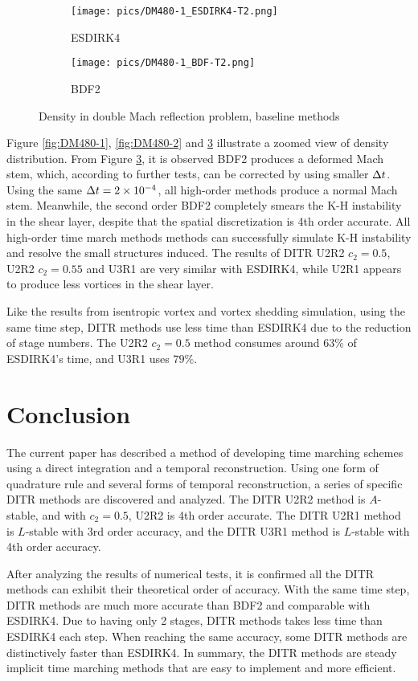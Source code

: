 \begin{figure}[htbp]
    \centering
    \begin{subfigure}{0.5\textwidth}
        \texttt{[image: pics/DM480-1\_ESDIRK4-T2.png]}
        \caption[]{ESDIRK4}
        \label{sfig:DM480_ESDIRK4}
    \end{subfigure}\hfill
    \begin{subfigure}{0.5\textwidth}
        \texttt{[image: pics/DM480-1\_BDF-T2.png]}
        \caption[]{BDF2}
        \label{sfig:DM480_BDF2}
    \end{subfigure}
    \caption{Density in double Mach reflection problem, baseline methods}
    \label{fig:DM480-3}
\end{figure}

Figure \ref{fig:DM480-1}, \ref{fig:DM480-2} and \ref{fig:DM480-3}
illustrate a zoomed view of density distribution.
From Figure \ref{fig:DM480-3},
it is observed BDF2 produces
a deformed Mach stem, which, according
to further tests, can be
corrected by using smaller $\mathrm\Delta t$.
Using the same $\mathrm\Delta t= 2\times10^{-4}$,
all high-order methods produce a
normal Mach stem.
Meanwhile, the second order BDF2
completely smears the K-H instability
in the shear layer, despite that the spatial
discretization is 4th order accurate.
All high-order time march methods methods can successfully
simulate K-H instability and resolve the
small structures induced.
The results of DITR U2R2 $c_2=0.5$, U2R2  $c_2=0.55$
and U3R1 are very similar with ESDIRK4, while U2R1
appears to produce less vortices in the shear layer.

Like the results from isentropic vortex and vortex shedding simulation,
using the same time step, DITR methods
use less time than ESDIRK4 due to the reduction of stage numbers.
The U2R2 $c_2=0.5$ method consumes around $63\%$ of ESDIRK4's time,
and U3R1 uses $79\%$.



\section{Conclusion}
\label{sec:Conc}

The current paper has described a method of
developing time marching schemes using a
direct integration and a temporal reconstruction.
Using one form of quadrature rule and several
forms of temporal reconstruction, a series of
specific DITR methods are discovered and analyzed.
The DITR U2R2 method is $A$-stable, and with $c_2=0.5$, U2R2 is 4th order accurate.
The DITR U2R1 method is $L$-stable with 3rd order accuracy, and
the DITR U3R1 method is $L$-stable with 4th order accuracy.

After analyzing the results of numerical tests, it is confirmed
all the DITR methods can exhibit their theoretical order of accuracy.
With the same time step, DITR methods are much more accurate than
BDF2 and comparable with ESDIRK4.
Due to having only 2 stages, DITR methods takes less time than ESDIRK4
each step.
When reaching the same accuracy, some DITR methods are
distinctively faster than ESDIRK4.
In summary, the DITR methods are steady implicit time marching methods
that are easy to implement and more efficient.